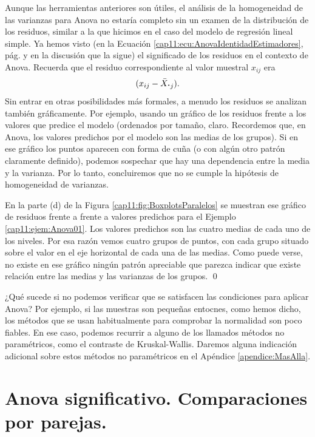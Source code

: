 Aunque las herramientas anteriores son útiles, el análisis de la homogeneidad de las varianzas para Anova no estaría completo sin un examen de la distribución de los residuos, similar a la que hicimos en el caso del modelo de regresión lineal simple. Ya hemos visto (en la Ecuación \ref{cap11:ecu:AnovaIdentidadEstimadores}, pág. \pageref{cap11:ecu:AnovaIdentidadEstimadores} y en la discusión que la sigue) el significado de los residuos en el contexto de Anova.  Recuerda que el residuo correspondiente al valor muestral $x_{ij}$ era
\[(x_{ij}-\bar X_{\mbox{\bf\large $\cdot$}j}).\]
Sin entrar en otras posibilidades más formales, a menudo los residuos se analizan también gráficamente. Por ejemplo, usando un gráfico de los residuos frente a los valores que predice el modelo (ordenados por tamaño, claro. Recordemos que, en Anova, los valores predichos por el modelo son las medias de los grupos). Si en ese gráfico los puntos aparecen con forma de cuña (o con algún otro patrón claramente definido), podemos sospechar que hay una dependencia entre la media y la varianza. Por lo tanto, concluiremos que no se cumple la hipótesis de homogeneidad de varianzas.
\begin{ejemplo}
En la parte (d) de la Figura \ref{cap11:fig:BoxplotsParalelos} se muestran ese gráfico de residuos frente a frente a valores predichos para el Ejemplo \ref{cap11:ejem:Anova01}. Los valores predichos son las cuatro medias de cada uno de los niveles. Por esa razón vemos cuatro grupos de puntos, con cada grupo situado sobre el valor en el eje horizontal de cada una de las medias. Como puede verse, no existe en ese gráfico ningún patrón apreciable que parezca indicar que existe relación entre las medias y las varianzas de los grupos.
\qed
\end{ejemplo}

¿Qué sucede si no podemos verificar que se satisfacen las condiciones para aplicar Anova? Por ejemplo, si las muestras son pequeñas entocnes, como hemos dicho,  los métodos que se usan habitualmente para comprobar la normalidad son poco fiables. En ese caso, podemos recurrir a alguno de los llamados {\sf métodos no paramétricos}, como el contraste de Kruskal-Wallis. Daremos alguna indicación adicional sobre estos métodos no paramétricos en el Apéndice \ref{apendice:MasAlla}.


\section{Anova significativo. Comparaciones por parejas.}
\label{cap11:sec:AnovaSignificativoComparacionesDosaDos}

